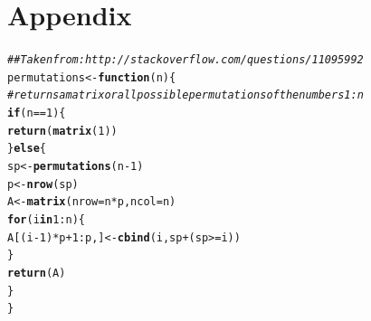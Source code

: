 \documentclass[12pt]{article}\usepackage[]{graphicx}\usepackage[]{color}
\makeatletter
\newcommand{\hlnum}[1]{\textcolor[rgb]{0.686,0.059,0.569}{#1}}%
\newcommand{\hlcom}[1]{\textcolor[rgb]{0.678,0.584,0.686}{\textit{#1}}}%
\newcommand{\hlopt}[1]{\textcolor[rgb]{0,0,0}{#1}}%
\newcommand{\hlstd}[1]{\textcolor[rgb]{0.345,0.345,0.345}{#1}}%
\newcommand{\hlkwa}[1]{\textcolor[rgb]{0.161,0.373,0.58}{\textbf{#1}}}%
\newcommand{\hlkwb}[1]{\textcolor[rgb]{0.69,0.353,0.396}{#1}}%
\newcommand{\hlkwc}[1]{\textcolor[rgb]{0.333,0.667,0.333}{#1}}%
\newcommand{\hlkwd}[1]{\textcolor[rgb]{0.737,0.353,0.396}{\textbf{#1}}}%
\newenvironment{kframe}{%
 \def\at@end@of@kframe{}%
 \ifinner\ifhmode%
  \def\at@end@of@kframe{\end{minipage}}%
  \begin{minipage}{\columnwidth}%
 \fi\fi%
 \def\FrameCommand##1{\hskip\@totalleftmargin \hskip-\fboxsep
 \colorbox{shadecolor}{##1}\hskip-\fboxsep
     \hskip-\linewidth \hskip-\@totalleftmargin \hskip\columnwidth}%
 \MakeFramed {\advance\hsize-\width
   \@totalleftmargin\z@ \linewidth\hsize
   \@setminipage}}%
 {\par\unskip\endMakeFramed%
 \at@end@of@kframe}
\newenvironment{knitrout}{}{} %
\makeatother
\begin{document}
\section{Appendix}

\begin{knitrout}
\color{fgcolor}\begin{kframe}
\begin{alltt}
\hlcom{## Taken from: http://stackoverflow.com/questions/11095992}
\hlstd{permutations} \hlkwb{<-} \hlkwa{function}\hlstd{(}\hlkwc{n}\hlstd{)\{}
  \hlcom{#returns a matrix or all possible permutations of the numbers 1:n}
  \hlkwa{if}\hlstd{(n}\hlopt{==}\hlnum{1}\hlstd{)\{}
  \hlkwd{return}\hlstd{(}\hlkwd{matrix}\hlstd{(}\hlnum{1}\hlstd{))}
    \hlstd{\}} \hlkwa{else} \hlstd{\{}
    \hlstd{sp} \hlkwb{<-} \hlkwd{permutations}\hlstd{(n}\hlopt{-}\hlnum{1}\hlstd{)}
    \hlstd{p} \hlkwb{<-} \hlkwd{nrow}\hlstd{(sp)}
    \hlstd{A} \hlkwb{<-} \hlkwd{matrix}\hlstd{(}\hlkwc{nrow}\hlstd{=n}\hlopt{*}\hlstd{p,}\hlkwc{ncol}\hlstd{=n)}
    \hlkwa{for}\hlstd{(i} \hlkwa{in} \hlnum{1}\hlopt{:}\hlstd{n)\{}
      \hlstd{A[(i}\hlopt{-}\hlnum{1}\hlstd{)}\hlopt{*}\hlstd{p}\hlopt{+}\hlnum{1}\hlopt{:}\hlstd{p,]} \hlkwb{<-} \hlkwd{cbind}\hlstd{(i,sp}\hlopt{+}\hlstd{(sp}\hlopt{>=}\hlstd{i))}
    \hlstd{\}}
    \hlkwd{return}\hlstd{(A)}
  \hlstd{\}}
\hlstd{\}}
\end{alltt}
\end{kframe}
\end{knitrout}
\end{document}
